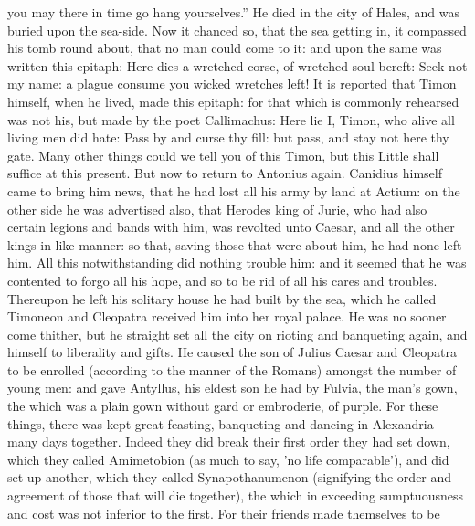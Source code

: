 \documentclass{book}
\begin{document}
you may there in time go hang yourselves.'' He died in the city of
Hales, and was buried upon the sea-side. Now it chanced so, that
the sea getting in, it compassed his tomb round about, that no man
could come to it: and upon the same was written this epitaph: Here
 dies a wretched corse, of
wretched soul bereft: Seek not my name: a plague consume you wicked
wretches left! It is reported that Timon himself, when he lived, made
this epitaph: for that which is commonly rehearsed was not his, but
made by the poet Callimachus: Here lie I, Timon, who alive all living
men did hate: Pass by and curse thy fill: but pass, and stay not here
thy gate.
Many other things could we tell you of this Timon, but this Little
shall suffice at this present. But now to return to Antonius again.
Canidius himself came to bring him news, that he had lost all his
army by land at Actium: on the other side he was advertised also,
that Herodes king of Jurie, who had also certain legions and bands
with him, was revolted unto Caesar, and all the other kings in like
manner: so that, saving those that were about him, he had none left
him. All this notwithstanding did nothing trouble him: and it
seemed that he was contented to forgo all his hope, and so to be rid
of all his cares and troubles. Thereupon he left his solitary house
 he had built by the sea, which he called Timoneon and Cleopatra received
him into her royal palace. He was no sooner come thither, but he
straight set all the city on rioting and banqueting again, and himself
to liberality and gifts. He caused the son of Julius Caesar
and Cleopatra to be enrolled (according to the manner of the Romans)
amongst the number of young men: and gave Antyllus, his eldest son he
had by Fulvia, the man's gown, the which was a plain gown without gard
or embroderie, of purple. For these things, there was kept great feasting, banqueting
and dancing in Alexandria many days together. Indeed they did break
their first order  they had set down, which they called Amimetobion (as
much to say, 'no life comparable'), and did set up another, which they
called Synapothanumenon (signifying the order and agreement of those
that will die together), the which in exceeding sumptuousness and cost
was not inferior to the first. For their friends made themselves to be
\end{document}
